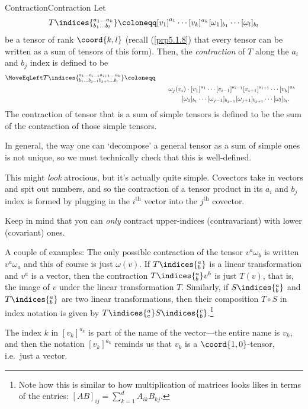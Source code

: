 \begin{dfn}{Contraction}{Contraction}
Let
\begin{equation}
T\indices{^{a_1\ldots a_k}_{b_1\ldots b_l}}\coloneqq [v_1]^{a_1}\cdots [v_k]^{a_k}[\omega _1]_{b_1}\cdots [\omega _l]_{b_l}
\end{equation}
be a tensor of rank $\coord{k,l}$ (recall (\cref{prp5.1.8}) that every tensor can be written as a sum of tensors of this form).  Then, the \emph{contraction} of $T$ along the $a_i$ and $b_j$ index is defined to be
\begin{equation}
\begin{split}
\MoveEqLeft
T\indices{^{a_1\ldots a_{i-1}a_{i+1}\ldots a_k}_{b_1\ldots b_{j-1}b_{j+1}\ldots b_l}}\coloneqq \\ 
& \qquad \omega _j(v_i)\cdot [v_1]^{a_1}\cdots [v_{i-1}]^{a_{i-1}}[v_{i+1}]^{a_{i+1}}\cdots [v_k]^{a_k} \\ & \qquad \qquad [\omega _1]_{b_1}\cdots [\omega _{j-1}]_{b_{j-1}}[\omega _{j+1}]_{b_{j+1}}\cdots [\omega _l]_{b_l}.
\end{split}
\end{equation}
The contraction of tensor that is a sum of simple tensors is defined to be the sum of the contraction of those simple tensors.
\begin{rmk}
In general, the way one can `decompose' a general tensor as a sum of simple ones is not unique, so we must technically check that this is well-defined.
\end{rmk}
\begin{rmk}
This might \emph{look} atrocious, but it's actually quite simple.  Covectors take in vectors and spit out numbers, and so the contraction of a tensor product in its $a_i$ and $b_j$ index is formed by plugging in the $i^{\text{th}}$ vector into the $j^{\text{th}}$ covector.
\end{rmk}
\begin{rmk}
Keep in mind that you can \emph{only} contract upper-indices (contravariant) with lower (covariant) ones.
\end{rmk}
\begin{rmk}
A couple of examples:  The only possible contraction of the tensor $v^a\omega _b$ is written $v^a\omega _a$ and this of course is just $\omega (v)$.  If $T\indices{^a_b}$ is a linear transformation and $v^a$ is a vector, then the contraction $T\indices{^a_b}v^b$ is just $T(v)$, that is, the image of $v$ under the linear transformation $T$.  Similarly, if $S\indices{^a_b}$ and $T\indices{^a_b}$ are two linear transformations, then their composition $T\circ S$ in index notation is given by $T\indices{^a_c}S\indices{^c_b}$.\footnote{Note how this is similar to how multiplication of matrices looks likes in terms of the entries:  $[AB]_{ij}=\sum _{k=1}^dA_{ik}B_{kj}$.}
\end{rmk}
\begin{rmk}
The index $k$ in $[v_k]^{a_k}$ is part of the name of the vector---the entire name is $v_k$, and then the notation $[v_k]^{a_k}$ reminds us that $v_k$ is a $\coord{1,0}$-tensor, i.e.~just a vector.
\end{rmk}
\end{dfn}
